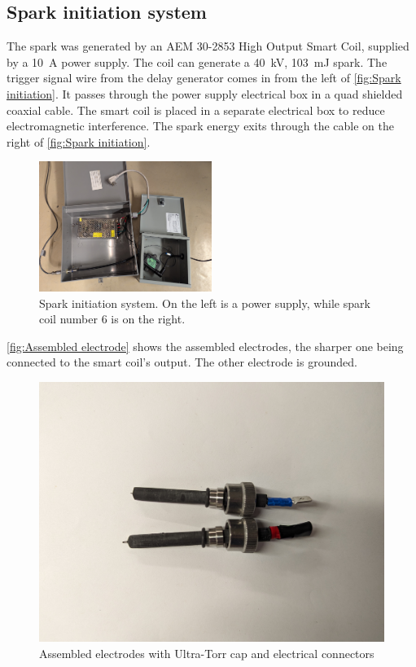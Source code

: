         \subsection{Spark initiation system}

            The spark was generated by an AEM 30-2853 High Output Smart Coil, supplied by a \qty{10}{A} power supply. The coil can generate a \qty{40}{kV}, \qty{103}{mJ} spark. The trigger signal wire from the delay generator comes in from the left of \autoref{fig:Spark initiation}. It passes through the power supply electrical box in a quad shielded coaxial cable. The smart coil is placed in a separate electrical box to reduce electromagnetic interference. The spark energy exits through the cable on the right of \autoref{fig:Spark initiation}. 

            \begin{figure}[!ht]
                \centering
                \includegraphics[width=0.50\textwidth]{assets/3 design/Spark initiation system.jpg}
                \caption{Spark initiation system. On the left is a power supply, while spark coil number 6 is on the right.}
                \label{fig:Spark initiation}
            \end{figure}

            \autoref{fig:Assembled electrode} shows the assembled electrodes, the sharper one being connected to the smart coil's output. The other electrode is grounded.

            \begin{figure}[!ht]
                \centering
                \includegraphics[width=\textwidth]{assets/3 design/V2 electrodes.jpg}
                \caption{Assembled electrodes with Ultra-Torr cap and electrical connectors}
                \label{fig:Assembled electrode}
            \end{figure}

